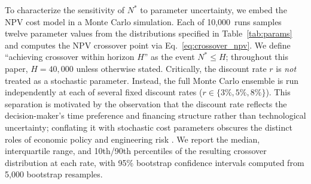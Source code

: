 \documentclass[preprint,12pt]{elsarticle}
\begin{document}
To characterize the sensitivity of $N^*$ to parameter uncertainty, we embed the NPV cost model in a Monte Carlo simulation. Each of 10{,}000~runs samples twelve parameter values from the distributions specified in Table~\ref{tab:params} and computes the NPV crossover point via Eq.~\ref{eq:crossover_npv}. We define ``achieving crossover within horizon $H$'' as the event $N^* \leq H$; throughout this paper, $H = 40{,}000$ unless otherwise stated. Critically, the discount rate $r$ is \emph{not} treated as a stochastic parameter. Instead, the full Monte Carlo ensemble is run independently at each of several fixed discount rates ($r \in \{3\%, 5\%, 8\%\}$). This separation is motivated by the observation that the discount rate reflects the decision-maker's time preference and financing structure rather than technological uncertainty; conflating it with stochastic cost parameters obscures the distinct roles of economic policy and engineering risk \cite{arrow2014}. We report the median, interquartile range, and 10th/90th percentiles of the resulting crossover distribution at each rate, with 95\% bootstrap confidence intervals computed from 5{,}000 bootstrap resamples.
\end{document}
